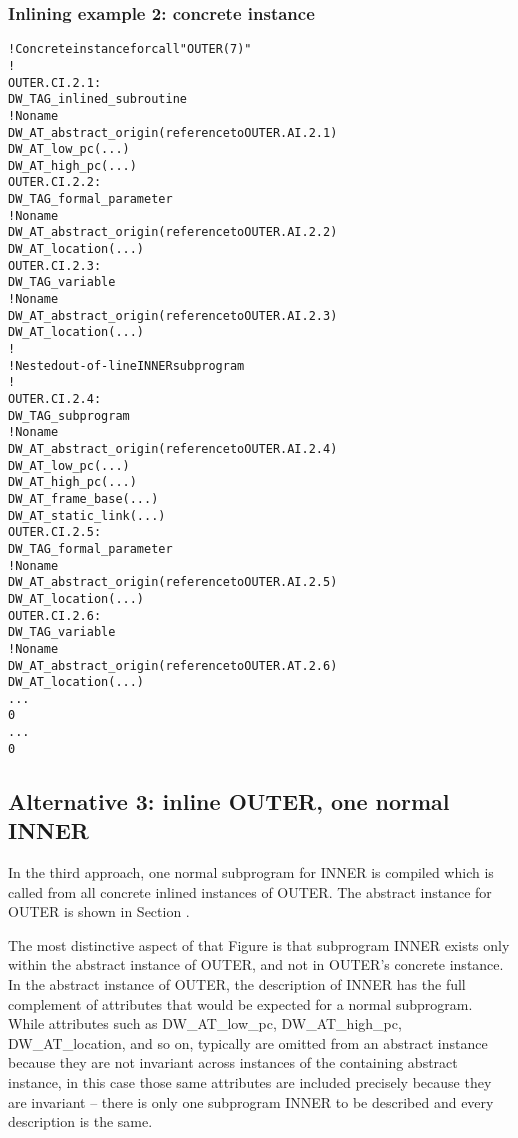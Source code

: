 \subsubsection{Inlining example 2: concrete instance}
\label{app:inliningexample2concreteinstance}
\begin{alltt}

    ! Concrete instance for call "OUTER(7)"
    !
OUTER.CI.2.1:
    DW\_TAG\_inlined\_subroutine
        ! No name
        DW\_AT\_abstract\_origin(reference to OUTER.AI.2.1)
        DW\_AT\_low\_pc(...)
        DW\_AT\_high\_pc(...)
OUTER.CI.2.2:
        DW\_TAG\_formal\_parameter
            ! No name
            DW\_AT\_abstract\_origin(reference to OUTER.AI.2.2)
            DW\_AT\_location(...)
OUTER.CI.2.3:
        DW\_TAG\_variable
            ! No name
            DW\_AT\_abstract\_origin(reference to OUTER.AI.2.3)
            DW\_AT\_location(...)
        !
        ! Nested out-of-line INNER subprogram
        !
OUTER.CI.2.4:
        DW\_TAG\_subprogram
            ! No name
            DW\_AT\_abstract\_origin(reference to OUTER.AI.2.4)
            DW\_AT\_low\_pc(...)
            DW\_AT\_high\_pc(...)
            DW\_AT\_frame\_base(...)
            DW\_AT\_static\_link(...)
OUTER.CI.2.5:
            DW\_TAG\_formal\_parameter
                ! No name
                DW\_AT\_abstract\_origin(reference to OUTER.AI.2.5)
                DW\_AT\_location(...)
OUTER.CI.2.6:
            DW\_TAG\_variable
                ! No name
                DW\_AT\_abstract\_origin(reference to OUTER.AT.2.6)
                DW\_AT\_location(...)
            ...
            0
        ...
        0
\end{alltt}

\subsection{Alternative 3: inline OUTER, one normal INNER}
\label{app:inlineouteronenormalinner}

In the third approach, one normal subprogram for INNER is
compiled which is called from all concrete inlined instances of
OUTER. The abstract instance for OUTER is shown in 
Section .

The most distinctive aspect of that Figure is that subprogram
INNER exists only within the abstract instance of OUTER,
and not in OUTER’s concrete instance. In the abstract
instance of OUTER, the description of INNER has the full
complement of attributes that would be expected for a
normal subprogram. While attributes such as DW\_AT\_low\_pc,
DW\_AT\_high\_pc, DW\_AT\_location, and so on, typically are omitted
from an abstract instance because they are not invariant across
instances of the containing abstract instance, in this case
those same attributes are included precisely because they are
invariant -- there is only one subprogram INNER to be described
and every description is the same.

